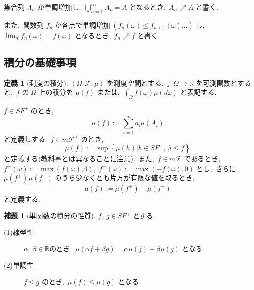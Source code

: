 \documentclass[a4j,11pt]{jarticle}
\theoremstyle{definition}
\newtheorem{definition}[theorem]{定義}
\newtheorem{lemma}[theorem]{補題}
\begin{document}
  集合列
  $A_n$
  が単調増加し,\ 
  $\bigcup_{n=1}^{\infty} A_n = A$
  となるとき,\ 
  $A_n \nearrow A$
  と書く.\ 

  また,\ 関数列
  $f_n$
  が各点で単調増加
  $(f_n(\omega) \leq f_{n+1}(\omega) \ldots)$
  し,\ 
  $\lim_{n} f_n(\omega) = f(\omega)$
  となるとき,\ 
  $f_n \nearrow f$
  と書く.\ 

\subsection{積分の基礎事項}
\begin{definition}[測度の積分]
  $(\Omega,\mathcal{F},\mu)$
  を測度空間とする.\ 
  $f:\Omega \to \mathbb{R}$
  を可測関数とすると,\ 
  $f$
  の
  $\Omega$
  上の積分を
  $\mu (f)$
  または,\ 
  $\int_{\Omega} f(\omega) \mu (d\omega)$
  と表記する.\ 

  $f \in SF^+$
  のとき,\ 
  \begin{equation}
    \mu (f) := \sum_{i=1}^m a_i \mu(A_i)
  \end{equation}
  と定義しする.\  
  $f \in m\mathcal{F}^+$
  のとき,\ 
  \begin{equation}
    \mu(f) := \sup\left\{ \mu(h) | h \in SF^+,\ h \leq f\right\}
  \end{equation}
  と定義する(教科書とは異なることに注意).\ 
  また,\ 
  $f\in m\mathcal{F}$
  であるとき,\ 
  $f^+(\omega) := \max(f(\omega),0)$,\ 
  $f^-(\omega) := \max(-f(\omega),0)$
  とし,\ さらに
  $\mu(f^+)\, \mu(f^-)$
  のうち少なくとも片方が有限な値を取るとき,\ 
  \begin{equation}
    \mu(f) := \mu(f^+) - \mu(f^-)
  \end{equation}
  と定義する.\ 
\end{definition}

\begin{lemma}[単関数の積分の性質]\label{lemma:int_nature}
  $f,\ g \in SF^+$
  とする.\ 
  \begin{description}
    \item[(1)線型性]
      $\alpha,\ \beta \in \mathbb{R}$のとき,\ 
      $\mu(\alpha f + \beta g) = \alpha \mu(f) + \beta \mu(g)$
      となる.\ 
    \item[(2)単調性]
      $f \leq g$
      のとき,\ 
      $\mu(f) \leq \mu(g)$
      となる.\ 
  \end{description}
\end{lemma}
\end{document}

